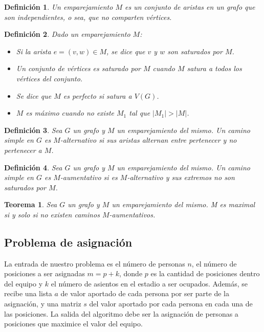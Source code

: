 \documentclass[10pt]{article} %
\newtheorem{thm}{Teorema}
\newtheorem{mydef}{Definici\'on}%
\begin{document}
	\begin{mydef}
		Un emparejamiento $ M $ es un conjunto de aristas en un grafo que son independientes, o sea, que no comparten v\'ertices.
	\end{mydef}
	
	\begin{mydef}
		\label{def:matching}
		Dado un emparejamiento $ M $:
		\begin{itemize}
			\item Si la arista $ e = (v, w) \in M $, se dice que $ v $ y $ w $ son saturados por $ M $.
			\item Un conjunto de v\'ertices es saturado por $ M $ cuando $ M $ satura a todos los v\'ertices del conjunto.
			\item Se dice que $ M $ es perfecto si satura a $ V(G) $.
			\item $ M $ es m\'aximo cuando no existe $ M_{1} $ tal que $ |M_{1}| > |M| $.
		\end{itemize}
	\end{mydef}
	
	\begin{mydef}
		Sea $ G $ un grafo y $ M $ un emparejamiento del mismo. Un camino simple en $ G $ es $ M $-alternativo si sus aristas alternan entre pertenecer y no pertenecer a $ M $.
	\end{mydef}
	
	\begin{mydef}
		\label{def:aumentativo}
		Sea $ G $ un grafo y $ M $ un emparejamiento del mismo. Un camino simple en $ G $ es $ M $-aumentativo si es $ M $-alternativo y sus extremos no son saturados por $ M $.
	\end{mydef}
	
	\begin{thm}
		Sea $ G $ un grafo y $ M $ un emparejamiento del mismo. M es maximal si y solo si no existen caminos $ M $-aumentativos.
	\end{thm}
	
	\subsection{Problema de asignaci\'on}
	
	La entrada de nuestro problema es el n\'umero de personas $ n $, el n\'umero de posiciones a ser asignadas $ m = p + k $, donde $ p $ es la cantidad de posiciones dentro del equipo y $ k $ el n\'umero de asientos en el estadio a ser ocupados. Adem\'as, se recibe una lista $ a $ de valor aportado de cada persona por ser parte de la asignaci\'on, y una matriz $ s $ del valor aportado por cada persona en cada una de las posiciones. La salida del algoritmo debe ser la asignaci\'on de personas a posiciones que maximice el valor del equipo.
	
\end{document}
